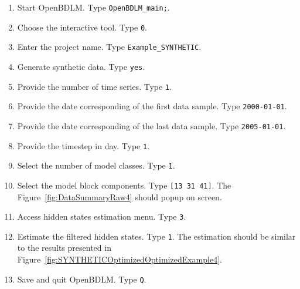 \begin{enumerate}
\item Start OpenBDLM. Type \colorbox{light-gray}{\lstinline[basicstyle = \mlttfamily \small, backgroundcolor = \color{light-gray}]!OpenBDLM_main;!}.
\item Choose the interactive tool. Type \colorbox{light-gray}{\lstinline[basicstyle = \mlttfamily \small, backgroundcolor = \color{light-gray}]!0!}.
\item Enter the project name. Type \colorbox{light-gray}{\lstinline[basicstyle = \mlttfamily \small, backgroundcolor = \color{light-gray}]!Example_SYNTHETIC!}. 
\item Generate synthetic data. Type \colorbox{light-gray}{\lstinline[basicstyle = \mlttfamily \small, backgroundcolor = \color{light-gray}]!yes!}. 
\item Provide the number of time series. Type \colorbox{light-gray}{\lstinline[basicstyle = \mlttfamily \small, backgroundcolor = \color{light-gray}]!1!}.
\item Provide  the date corresponding of the first data sample. Type \colorbox{light-gray}{\lstinline[basicstyle = \mlttfamily \small, backgroundcolor = \color{light-gray}]!2000-01-01!}.
\item Provide  the date corresponding of the last data sample. Type \colorbox{light-gray}{\lstinline[basicstyle = \mlttfamily \small, backgroundcolor = \color{light-gray}]!2005-01-01!}.
\item Provide  the timestep in day. Type \colorbox{light-gray}{\lstinline[basicstyle = \mlttfamily \small, backgroundcolor = \color{light-gray}]!1!}.
\item Select the number of model classes. Type \colorbox{light-gray}{\lstinline[basicstyle = \mlttfamily \small, backgroundcolor = \color{light-gray}]!1!}. 
\item Select the model block components. Type \colorbox{light-gray}{\lstinline[basicstyle = \mlttfamily \small, backgroundcolor = \color{light-gray}]![13 31 41]!}. The Figure~\ref{fig:DataSummaryRaw4} should popup on screen.
\item Access hidden states estimation menu. Type \colorbox{light-gray}{\lstinline[basicstyle = \mlttfamily \small, backgroundcolor = \color{light-gray}]!3!}. 
\item Estimate the filtered hidden states. Type \colorbox{light-gray}{\lstinline[basicstyle = \mlttfamily \small, backgroundcolor = \color{light-gray}]!1!}. The estimation should be similar to the results presented in Figure~\ref{fig:SYNTHETICOptimizedOptimizedExample4}.
\item Save and quit OpenBDLM. Type \colorbox{light-gray}{\lstinline[basicstyle = \mlttfamily \small, backgroundcolor = \color{light-gray}]!Q!}.
\end{enumerate}




